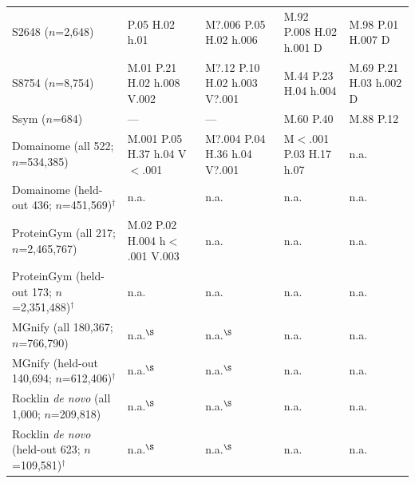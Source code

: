 \begin{table}[H]
{\begin{tabular}{@{}lllll}
        S2648 ($n$=2,648) & P.05 H.02 h.01 & M?.006 P.05 H.02 h.006 & M.92 P.008 H.02 h.001 D & M.98 P.01 H.007 D \\
        S8754 ($n$=8,754) & M.01 P.21 H.02 h.008 V.002 & M?.12 P.10 H.02 h.003 V?.001 & M.44 P.23 H.04 h.004 & M.69 P.21 H.03 h.002 D \\
        Ssym ($n$=684) & --- & --- & M.60 P.40 & M.88 P.12 \\
        \midrule
        Domainome (all 522; $n$=534,385) & M.001 P.05 H.37 h.04 V$<$.001 & M?.004 P.04 H.36 h.04 V?.001 & M$<$.001 P.03 H.17 h.07 & n.a. \\
        Domainome (held-out 436; $n$=451,569)$^\dagger$ & n.a. & n.a. & n.a. & n.a. \\
        ProteinGym (all 217; $n$=2,465,767) & M.02 P.02 H.004 h$<$.001 V.003 & n.a. & n.a. & n.a. \\
        ProteinGym (held-out 173; $n$=2,351,488)$^\dagger$ & n.a. & n.a. & n.a. & n.a. \\
        MGnify (all 180,367; $n$=766,790) & n.a.$^\S$ & n.a.$^\S$ & n.a. & n.a. \\
        MGnify (held-out 140,694; $n$=612,406)$^\dagger$ & n.a.$^\S$ & n.a.$^\S$ & n.a. & n.a. \\
        Rocklin \textit{de novo} (all 1,000; $n$=209,818) & n.a.$^\S$ & n.a.$^\S$ & n.a. & n.a. \\
        Rocklin \textit{de novo} (held-out 623; $n$=109,581)$^\dagger$ & n.a.$^\S$ & n.a.$^\S$ & n.a. & n.a. \\
    \bottomrule
    \end{tabular}
    }
    \par\bigskip
\end{table}


